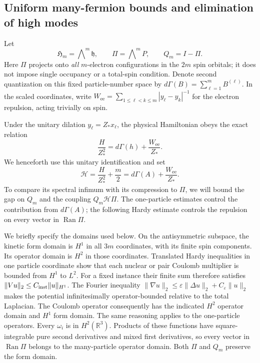 \subsection{Uniform many-fermion bounds and elimination of high modes}

Let
\[
 \mathfrak H_m=\bigwedge\nolimits^m\mathfrak h,\qquad
 \Pi=\bigwedge\nolimits^mP,\qquad Q_m=I-\Pi .
\]
Here \(\Pi\) projects onto \emph{all} \(m\)-electron configurations
in the \(2m\) spin orbitals; it does not impose single occupancy
or a total-spin condition.  Denote second quantization on this
fixed particle-number space by
\(d\Gamma(B)=\sum_{\ell=1}^mB^{(\ell)}\).
In the scaled coordinates, write
\(W_{\mathrm{ee}}=\sum_{1\le\ell<k\le m}|y_\ell-y_k|^{-1}\)
for the electron repulsion, acting trivially on spin.

Under the unitary dilation \(y_\ell=Z_*x_\ell\), the physical
Hamiltonian obeys the exact relation
\begin{equation}
 \frac{H}{Z_*^2}
 =d\Gamma(h)+\frac{W_{\mathrm{ee}}}{Z_*}.
 \label{eq:continuum-exact-dilation}
\end{equation}
We henceforth use this unitary identification and set
\begin{equation}
 \mathcal H=\frac{H}{Z_*^2}+\frac m2
 =d\Gamma(A)+\frac{W_{\mathrm{ee}}}{Z_*}.
 \label{eq:continuum-scaled-hamiltonian}
\end{equation}
To compare its spectral infimum with its compression to \(\Pi\),
we will bound the gap on \(Q_m\) and the coupling
\(Q_m\mathcal H\Pi\). The one-particle estimates control the
contribution from \(d\Gamma(A)\); the following Hardy estimate
controls the repulsion on every vector in \(\operatorname{Ran}\Pi\).

We briefly specify the domains used below.  On the antisymmetric
subspace, the kinetic form domain is \(H^1\) in all \(3m\)
coordinates, with its finite spin components.  Its operator
domain is \(H^2\) in those coordinates.  Translated Hardy
inequalities in one particle coordinate show that each nuclear
or pair Coulomb multiplier is bounded from \(H^1\) to \(L^2\).
For a fixed instance their finite sum therefore satisfies
\(\|Vu\|_2\le C_{\rm inst}\|u\|_{H^1}\).
The Fourier inequality
\(\|\nabla u\|_2\le\varepsilon\|\Delta u\|_2+
C_\varepsilon\|u\|_2\)
makes the potential infinitesimally operator-bounded relative
to the total Laplacian.  The Coulomb operator consequently has
the indicated \(H^2\) operator domain and \(H^1\) form domain.
The same reasoning applies to the one-particle operators.
Every \(\omega_i\) is in \(H^2(\mathbb R^3)\).  Products of these
functions have square-integrable pure second derivatives and
mixed first derivatives, so every vector in \(\operatorname{Ran}\Pi\)
belongs to the many-particle operator domain.  Both \(\Pi\) and
\(Q_m\) preserve the form domain.

